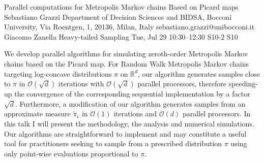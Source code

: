 \begin{talk}
  {Parallel computations for Metropolis Markov chains Based on Picard maps}%
  {Sebastiano Grazzi}%
  {Department of Decision Sciences and BIDSA, Bocconi University, Via Roentgen, 1, 20136, Milan, Italy}%
  {sebastiano.grazzi@unibocconi.it}%
  {Giacomo Zanella}%
  {Heavy-tailed Sampling}%
  {Tue, Jul 29 10:30–12:30}%
  {S10-2}%
  {S10}%
				
			

 We develop parallel algorithms for simulating zeroth-order Metropolis Markov chains based on the Picard map. 
For Random Walk Metropolis Markov chains targeting log-concave distributions $\pi$ on $\mathbb{R}^d$, our algorithm  
generates samples %
close to $\pi$ %
in $\mathcal{O}(\sqrt{d})$ iterations with $\mathcal{O}(\sqrt{d})$ parallel processors, 
therefore speeding-up the convergence of the corresponding sequential implementation by a factor $\sqrt{d}$. Furthermore, a modification of our algorithm generates samples from an approximate measure $\tilde \pi_\epsilon$ in $\mathcal{O}(1)$ iterations and $\mathcal{O}(d)$ parallel processors. In this talk I will present the methodology, the analysis and numerical simulations. Our algorithms are straightforward to implement and may constitute a useful tool for practitioners seeking to sample from a prescribed distribution $\pi$ using only point-wise evaluations proportional to $\pi$.
\end{talk}

